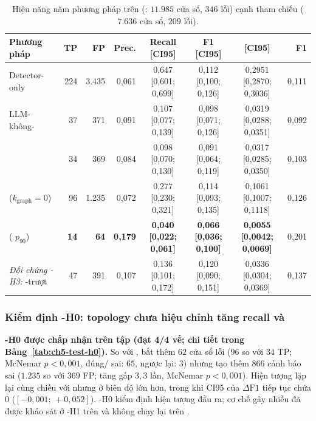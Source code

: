 \begin{table}[H]
  \centering
  \caption[So sánh tổng quan năm phương pháp trên test cạnh val]{Hiệu năng năm phương pháp trên  (: $11.985$ cửa sổ, $346$ lỗi) cạnh tham chiếu  ($7.636$ cửa sổ, $209$ lỗi).}
  \label{tab:ch5-test-overview}
  \tblfontwide
  \tblsetup
  \setlength{\tabcolsep}{2.5pt}
  \begin{tabularx}{\linewidth}{|Y|r|r|r|c|c|c|r|}
    \hline
    \textbf{Phương pháp} & \textbf{TP} & \textbf{FP} & \textbf{Prec.} & \textbf{Recall [CI95]} & \textbf{F1 [CI95]} & \textbf{ [CI95]} & \textbf{ F1} \\
    \hline
    Detector-only & 224 & 3.435 & 0,061 & 0,647 [0,601; 0,699] & 0,112 [0,100; 0,126] & 0,2951 [0,2870; 0,3036] & 0,111 \\
    \hline
    LLM-không- & 37 & 371 & 0,091 & 0,107 [0,077; 0,139] & 0,098 [0,071; 0,126] & 0,0319 [0,0288; 0,0351] & 0,092 \\
    \hline
     & 34 & 369 & 0,084 & 0,098 [0,070; 0,130] & 0,091 [0,064; 0,119] & 0,0317 [0,0285; 0,0350] & 0,103 \\
    \hline
     ($k_{\text{graph}} = 0$) & 96 & 1.235 & 0,072 & 0,277 [0,230; 0,321] & 0,114 [0,093; 0,135] & 0,1061 [0,1007; 0,1118] & 0,126 \\
    \hline
    \textbf{\CTAV{}} ( $p_{90}$) & \textbf{14} & \textbf{64} & \textbf{0,179} & \textbf{0,040 [0,022; 0,061]} & \textbf{0,066 [0,036; 0,100]} & \textbf{0,0055 [0,0042; 0,0069]} & 0,201 \\
    \hline
    \emph{Đối chứng \hyp{H3}:} -trượt & 47 & 391 & 0,107 & 0,136 [0,101; 0,172] & 0,120 [0,090; 0,151] & 0,0336 [0,0304; 0,0369] & 0,137 \\
    \hline
  \end{tabularx}
\end{table}

\subsubsection{Kiểm định \hyp{H0}: topology chưa hiệu chỉnh tăng recall và }
\label{sec:ch5-test-h0}

\textbf{\hyp{H0} được chấp nhận trên tập  (đạt 4/4 vế; chi tiết trong Bảng~\ref{tab:ch5-test-h0}).} So với ,  bắt thêm $62$ cửa sổ lỗi ($96$ so với $34$ TP; McNemar $p < 0{,}001$,  đúng/ sai: $65$, ngược lại: $3$) nhưng tạo thêm $866$ cảnh báo sai ($1.235$ so với $369$ FP;  tăng gấp $3{,}3$ lần, McNemar $p < 0{,}001$). Hiện tượng lặp lại cùng chiều với  nhưng ở biên độ lớn hơn, trong khi CI95 của $\Delta\text{F1}$ tiếp tục chứa $0$ ($[-0{,}001;\, +0{,}052]$). \hyp{H0} kiểm định hiện tượng đầu ra; cơ chế gây nhiễu đã được khảo sát ở \hyp{H1} trên  và không chạy lại trên .

